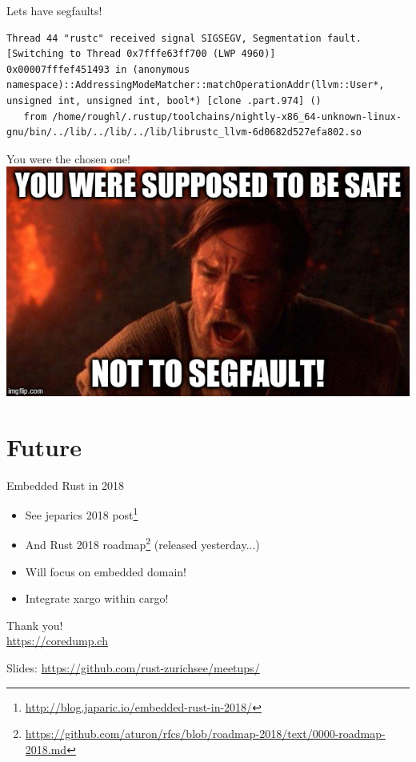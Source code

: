 \documentclass[aspectratio=1610,14pt,t]{beamer}
\begin{document}
\begin{frame}[c,fragile]{Lets have segfaults!}
  \begin{verbatim}
Thread 44 "rustc" received signal SIGSEGV, Segmentation fault.
[Switching to Thread 0x7fffe63ff700 (LWP 4960)]
0x00007fffef451493 in (anonymous namespace)::AddressingModeMatcher::matchOperationAddr(llvm::User*, unsigned int, unsigned int, bool*) [clone .part.974] ()
   from /home/roughl/.rustup/toolchains/nightly-x86_64-unknown-linux-gnu/bin/../lib/../lib/../lib/librustc_llvm-6d0682d527efa802.so
  \end{verbatim}
\end{frame}

\begin{frame}[c]{You were the chosen one!}
  \centering
  \includegraphics[width=.8\textwidth]{img/not-so-safe-rust.jpg}
\end{frame}

\section{Future}

\begin{frame}[c]{Embedded Rust in 2018}
  \begin{itemize}
    \item See jeparics 2018 post\footnote{\url{http://blog.japaric.io/embedded-rust-in-2018/}}
    \item And Rust 2018 roadmap\footnote{\url{https://github.com/aturon/rfcs/blob/roadmap-2018/text/0000-roadmap-2018.md}} (released yesterday...)
    \item<2-> Will focus on embedded domain!
    \item<2-> Integrate xargo within cargo!
  \end{itemize}
\end{frame}


{
\begin{frame}[standout]
  \begin{centering}
    {\Huge Thank you!}\\
    {\normalsize \url{https://coredump.ch}}\\
  \end{centering}
  {\small Slides: \url{https://github.com/rust-zurichsee/meetups/}}\\
  \vspace{3cm}
\end{frame}
}
\end{document}
